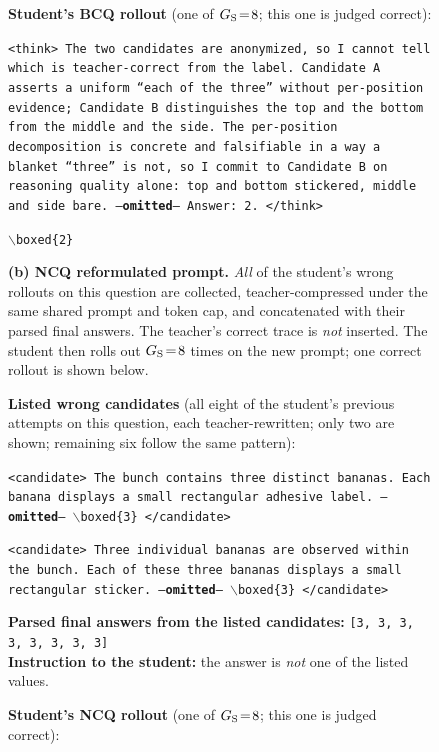 \begin{figure}[!p]
\begin{prompttemplatefig}
\textbf{Student's BCQ rollout} (one of $G_{\rm S}\!=\!8$; this one is judged correct):

\smallskip
\texttt{<think> The two candidates are anonymized, so I cannot tell which is teacher-correct from the label. Candidate~A asserts a uniform ``each of the three'' without per-position evidence; Candidate~B distinguishes the top and the bottom from the middle and the side. The per-position decomposition is concrete and falsifiable in a way a blanket ``three'' is not, so I commit to Candidate~B on reasoning quality alone: top and bottom stickered, middle and side bare. ---\textbf{omitted}--- Answer: 2. </think>}

\smallskip
\texttt{$\backslash$boxed\{2\}} \quad \textcolor{posgain}{\checkmark}
\end{prompttemplatefig}

\vspace{1pt}\noindent\textbf{(b) NCQ reformulated prompt.} \emph{All} of the student's wrong rollouts on this question are collected, teacher-compressed under the same shared prompt and token cap, and concatenated with their parsed final answers. The teacher's correct trace is \emph{not} inserted. The student then rolls out $G_{\rm S}\!=\!8$ times on the new prompt; one correct rollout is shown below.

\begin{negcandidatebox}
\textbf{Listed wrong candidates} (all eight of the student's previous attempts on this question, each teacher-rewritten; only two are shown; remaining six follow the same pattern):

\smallskip
\texttt{<candidate> The bunch contains three distinct bananas. Each banana displays a small rectangular adhesive label. ---\textbf{omitted}--- $\backslash$boxed\{3\} </candidate>}

\smallskip
\texttt{<candidate> Three individual bananas are observed within the bunch. Each of these three bananas displays a small rectangular sticker. ---\textbf{omitted}--- $\backslash$boxed\{3\} </candidate>}

\smallskip
\textbf{Parsed final answers from the listed candidates:} \texttt{[3, 3, 3, 3, 3, 3, 3, 3]} \\
\textbf{Instruction to the student:} the answer is \emph{not} one of the listed values.
\end{negcandidatebox}

\begin{prompttemplatefig}
\textbf{Student's NCQ rollout} (one of $G_{\rm S}\!=\!8$; this one is judged correct):


\end{prompttemplatefig}
\end{figure}
